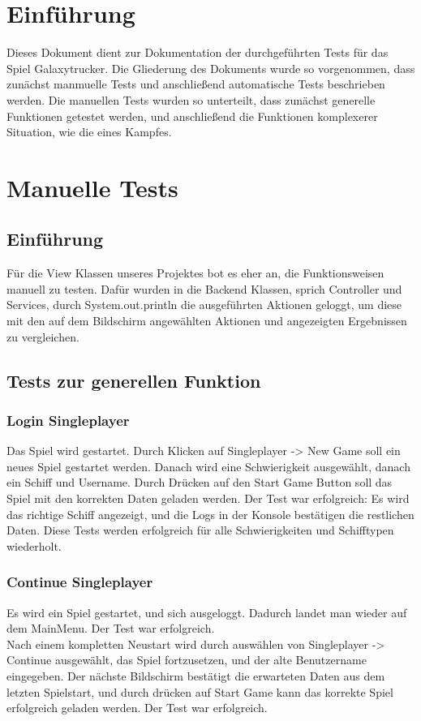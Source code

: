 \documentclass[fontsize=12pt,paper=a4,twoside]{scrartcl}
\begin{document}
\tableofcontents

\newpage

\section{Einführung}
Dieses Dokument dient zur Dokumentation der durchgeführten Tests für das Spiel Galaxytrucker. Die Gliederung des Dokuments wurde so vorgenommen, dass zunächst manmuelle Tests und anschließend automatische Tests beschrieben werden. Die manuellen Tests wurden so unterteilt, dass zunächst generelle Funktionen getestet werden, und anschließend die Funktionen komplexerer Situation, wie die eines Kampfes. \\

\section{Manuelle Tests}

\subsection{Einführung}
Für die View Klassen unseres Projektes bot es eher an, die Funktionsweisen manuell zu testen. 
Dafür wurden in die Backend Klassen, sprich Controller und Services, durch System.out.println die ausgeführten Aktionen geloggt, um diese mit den auf dem Bildschirm angewählten Aktionen und angezeigten Ergebnissen zu vergleichen. \\
\subsection{Tests zur generellen Funktion}
\subsubsection{Login Singleplayer}
Das Spiel wird gestartet. Durch Klicken auf Singleplayer -> New Game soll ein neues Spiel gestartet werden. Danach wird eine Schwierigkeit ausgewählt, danach ein Schiff und Username. Durch Drücken auf den Start Game Button soll das Spiel mit den korrekten Daten geladen werden. Der Test war erfolgreich: Es wird das richtige Schiff angezeigt, und die Logs in der Konsole bestätigen die restlichen Daten. Diese Tests werden erfolgreich für alle Schwierigkeiten und Schifftypen wiederholt. \\
\subsubsection{Continue Singleplayer}
Es wird ein Spiel gestartet, und sich ausgeloggt. Dadurch landet man wieder auf dem MainMenu. Der Test war erfolgreich. \\
Nach einem kompletten Neustart wird durch auswählen von Singleplayer -> Continue ausgewählt, das Spiel fortzusetzen, und der alte Benutzername eingegeben. Der nächste Bildschirm bestätigt die erwarteten Daten aus dem letzten Spielstart, und durch drücken auf Start Game kann das korrekte Spiel erfolgreich geladen werden. Der Test war erfolgreich. \\
\end{document}
